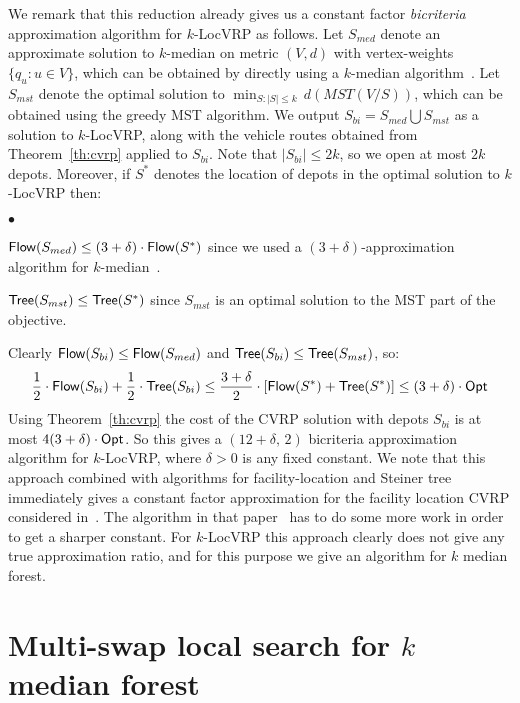 \documentclass[11pt,twoside,a4paper]{article}
\newcommand{\initOneLiners}{\setlength{\itemsep}{0pt}
    \setlength{\parsep }{0pt}
    \setlength{\topsep }{0pt}
}
\newenvironment{OneLiners}[1][\ensuremath{\bullet}]
    {\begin{list}
        {#1}
        {\initOneLiners}}
    {\end{list}}
\def\lrp{$k$-LocVRP\xspace}
\def\opt{{\sf Opt}\xspace}
\def\kmf{$k$ median forest\xspace}
\begin{document}
We remark that this reduction already gives us a constant factor {\em bicriteria} approximation algorithm for \lrp as
follows. Let $S_{med}$ denote an approximate solution to $k$-median on metric $(V,d)$ with vertex-weights $\{q_u:u\in
V\}$, which can be obtained by directly using a $k$-median algorithm~\cite{AGKMMP04}. Let $S_{mst}$ denote the optimal
solution to $\min_{S: |S|\le k} \, d(MST(V/S))$, which can be obtained using the greedy MST algorithm. We output
$S_{bi}=S_{med}\bigcup S_{mst}$ as a solution to \lrp, along with the vehicle routes obtained from
Theorem~\ref{th:cvrp} applied to $S_{bi}$. Note that $|S_{bi}|\le 2k$, so we open at most $2k$ depots. Moreover, if
$S^*$ denotes the location of depots in the optimal solution to \lrp then:
\begin{OneLiners}
\item ${\sf Flow}(S_{med})\le (3+\delta)\cdot {\sf Flow}(S^*)$ since we used a $(3+\delta)$-approximation algorithm for
$k$-median~\cite{AGKMMP04}.
\item ${\sf Tree}(S_{mst})\le {\sf Tree}(S^*)$ since  $S_{mst}$ is an optimal solution to the MST part of the objective.
\end{OneLiners}
Clearly ${\sf Flow}(S_{bi}) \le {\sf Flow}(S_{med})$ and ${\sf Tree}(S_{bi}) \le {\sf Tree}(S_{mst})$, so:
$$\frac12\cdot \flow(S_{bi}) + \frac12\cdot \tree(S_{bi}) \le \frac{3+\delta}2 \cdot \left[
\flow(S^*) + \tree(S^*)\right] \le (3+\delta)\cdot \opt$$ Using Theorem~\ref{th:cvrp} the cost of the CVRP solution
with depots $S_{bi}$ is at most $4(3+\delta)\cdot \opt$. So this gives a $(12+\delta,\, 2)$ bicriteria approximation
algorithm for \lrp, where $\delta>0$ is any fixed constant. We note that this approach combined with algorithms for
facility-location and Steiner tree immediately gives a constant factor approximation for the facility location CVRP
considered in~\cite{HKM10}. The algorithm in that paper~\cite{HKM10} has to do  some more work in order to get a
sharper constant. For \lrp this approach clearly does not give any true approximation ratio, and for this purpose we
give an algorithm for \kmf.





\section{Multi-swap local search for \kmf} \label{sec:kmf}
\def\swap{\ensuremath{\mathcal{S}}\xspace}
\def\p{\ensuremath{\mathcal{P}}\xspace}
\def\f{\ensuremath{\mathcal{F}}\xspace}
\def\C{\ensuremath{\mathcal{C}}\xspace}
\end{document}
